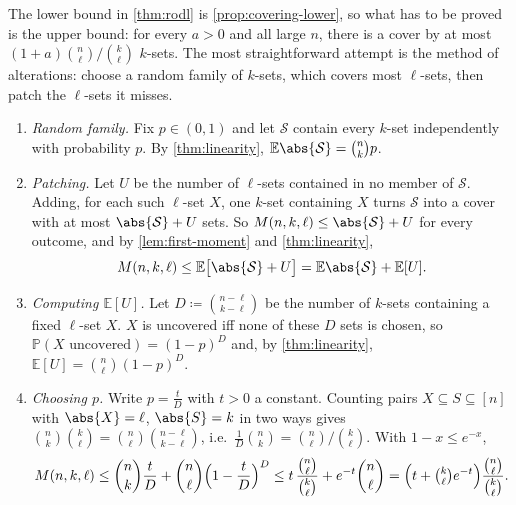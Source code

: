 The lower bound in \autoref{thm:rodl} is \autoref{prop:covering-lower}, so what has to be proved is the upper bound: for every \(a > 0\) and all large \(n\), there is a cover by at most \((1 + a) \binom{n}{\ell} \big/ \binom{k}{\ell}\) \(k\)-sets. The most straightforward attempt is the method of alterations: choose a random family of \(k\)-sets, which covers most \(\ell\)-sets, then patch the \(\ell\)-sets it misses.
\begin{enumerate}[(1)]
    \item \emph{Random family.} Fix \(p \in (0,1)\) and let \(\mathcal{S}\) contain every \(k\)-set independently with probability \(p\). By \autoref{thm:linearity}, \(\mathbb{E}\abs{\mathcal{S}} = \binom{n}{k} p\).
    \item \emph{Patching.} Let \(U\) be the number of \(\ell\)-sets contained in no member of \(\mathcal{S}\). Adding, for each such \(\ell\)-set \(X\), one \(k\)-set containing \(X\) turns \(\mathcal{S}\) into a cover with at most \(\abs{\mathcal{S}} + U\) sets. So \(M(n,k,\ell) \le \abs{\mathcal{S}} + U\) for every outcome, and by \autoref{lem:first-moment} and \autoref{thm:linearity},
    \[
        M(n,k,\ell) \le \mathbb{E}\bigl[ \abs{\mathcal{S}} + U \bigr] = \mathbb{E}\abs{\mathcal{S}} + \mathbb{E}[U].
    \]
    \item \emph{Computing \(\mathbb{E}[U]\).} Let \(D \coloneqq \binom{n-\ell}{k-\ell}\) be the number of \(k\)-sets containing a fixed \(\ell\)-set \(X\). \(X\) is uncovered iff none of these \(D\) sets is chosen, so \(\mathbb{P}(X \text{ uncovered}) = (1-p)^{D}\) and, by \autoref{thm:linearity}, \(\mathbb{E}[U] = \binom{n}{\ell} (1-p)^{D}\).
    \item \emph{Choosing \(p\).} Write \(p = \frac{t}{D}\) with \(t > 0\) a constant. Counting pairs \(X \subseteq S \subseteq [n]\) with \(\abs{X} = \ell\), \(\abs{S} = k\) in two ways gives \(\binom{n}{k}\binom{k}{\ell} = \binom{n}{\ell}\binom{n-\ell}{k-\ell}\), i.e.\ \(\frac{1}{D}\binom{n}{k} = \binom{n}{\ell} \big/ \binom{k}{\ell}\). With \(1 - x \le e^{-x}\),
    \begin{equation}\label{eq:random-cover-bound}
        M(n,k,\ell) \le \binom{n}{k} \frac{t}{D} + \binom{n}{\ell} \Bigl( 1 - \frac{t}{D} \Bigr)^{D}
        \le t\, \frac{\binom{n}{\ell}}{\binom{k}{\ell}} + e^{-t} \binom{n}{\ell}
        = \Bigl( t + \tbinom{k}{\ell} e^{-t} \Bigr) \frac{\binom{n}{\ell}}{\binom{k}{\ell}} .
    \end{equation}
\end{enumerate}

